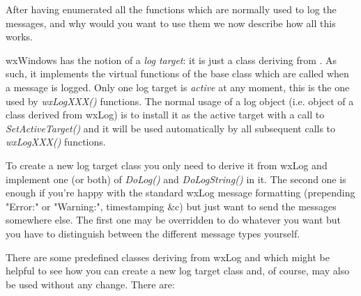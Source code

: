 After having enumerated all the functions which are normally used to log the
messages, and why would you want to use them we now describe how all this
works.

wxWindows has the notion of a {\it log target}: it is just a class deriving
from . As such, it implements the virtual functions of
the base class which are called when a message is logged. Only one log target
is {\it active} at any moment, this is the one used by {\it wxLogXXX()}
functions. The normal usage of a log object (i.e. object of a class derived
from wxLog) is to install it as the active target with a call to {\it
SetActiveTarget()} and it will be used automatically by all subsequent calls
to {\it wxLogXXX()} functions.

To create a new log target class you only need to derive it from wxLog and
implement one (or both) of {\it DoLog()} and {\it DoLogString()} in it. The
second one is enough if you're happy with the standard wxLog message
formatting (prepending "Error:" or "Warning:", timestamping \&c) but just want
to send the messages somewhere else. The first one may be overridden to do
whatever you want but you have to distinguish between the different message
types yourself.

There are some predefined classes deriving from wxLog and which might be
helpful to see how you can create a new log target class and, of course, may
also be used without any change. There are:

